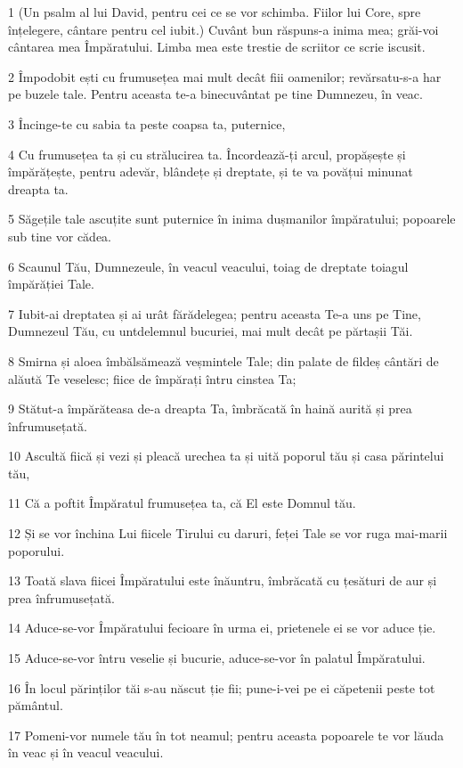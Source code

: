 \par 1 (Un psalm al lui David, pentru cei ce se vor schimba. Fiilor lui Core, spre înțelegere, cântare pentru cel iubit.) Cuvânt bun răspuns-a inima mea; grăi-voi cântarea mea Împăratului. Limba mea este trestie de scriitor ce scrie iscusit.
\par 2 Împodobit ești cu frumusețea mai mult decât fiii oamenilor; revărsatu-s-a har pe buzele tale. Pentru aceasta te-a binecuvântat pe tine Dumnezeu, în veac.
\par 3 Încinge-te cu sabia ta peste coapsa ta, puternice,
\par 4 Cu frumusețea ta și cu strălucirea ta. Încordează-ți arcul, propășește și împărățește, pentru adevăr, blândețe și dreptate, și te va povățui minunat dreapta ta.
\par 5 Săgețile tale ascuțite sunt puternice în inima dușmanilor împăratului; popoarele sub tine vor cădea.
\par 6 Scaunul Tău, Dumnezeule, în veacul veacului, toiag de dreptate toiagul împărăției Tale.
\par 7 Iubit-ai dreptatea și ai urât fărădelegea; pentru aceasta Te-a uns pe Tine, Dumnezeul Tău, cu untdelemnul bucuriei, mai mult decât pe părtașii Tăi.
\par 8 Smirna și aloea îmbălsămează veșmintele Tale; din palate de fildeș cântări de alăută Te veselesc; fiice de împărați întru cinstea Ta;
\par 9 Stătut-a împărăteasa de-a dreapta Ta, îmbrăcată în haină aurită și prea înfrumusețată.
\par 10 Ascultă fiică și vezi și pleacă urechea ta și uită poporul tău și casa părintelui tău,
\par 11 Că a poftit Împăratul frumusețea ta, că El este Domnul tău.
\par 12 Și se vor închina Lui fiicele Tirului cu daruri, feței Tale se vor ruga mai-marii poporului.
\par 13 Toată slava fiicei Împăratului este înăuntru, îmbrăcată cu țesături de aur și prea înfrumusețată.
\par 14 Aduce-se-vor Împăratului fecioare în urma ei, prietenele ei se vor aduce ție.
\par 15 Aduce-se-vor întru veselie și bucurie, aduce-se-vor în palatul Împăratului.
\par 16 În locul părinților tăi s-au născut ție fii; pune-i-vei pe ei căpetenii peste tot pământul.
\par 17 Pomeni-vor numele tău în tot neamul; pentru aceasta popoarele te vor lăuda în veac și în veacul veacului.

